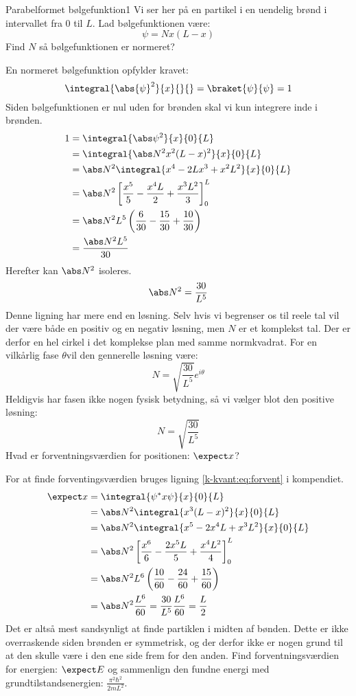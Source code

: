 \begin{opgave}{Parabelformet bølgefunktion}{1}\label{kvant:opg:parabel}
Vi ser her på en partikel i en uendelig brønd i intervallet fra $0$ til $L$. Lad bølgefunktionen være:
$$
\psi = Nx(L-x)
$$
\opg Find $N$ så bølgefunktionen er normeret?

En normeret bølgefunktion opfylder kravet:
$$
\integral{\abs{\psi}^2}{x}{}{}=\braket{\psi}{\psi}=1
$$
Siden bølgefunktionen er nul uden for brønden skal vi kun integrere inde i brønden.
\begin{align*}
    1 &= \integral{\abs \psi^2}{x}{0}{L}\\
    &= \integral{\abs N^2 x^2(L-x)^2}{x}{0}{L}\\
    &= \abs N^2\integral{x^4-2Lx^3+x^2L^2}{x}{0}{L}\\
    &= \abs N^2\left[\frac{x^5}{5}-\frac{x^4L}{2}+\frac{x^3L^2}{3}\right]_0^L\\
    &= \abs N^2L^5\left(\frac{6}{30}-\frac{15}{30}+\frac{10}{30}\right)\\
    &=\frac{\abs N^2L^5}{30}
\end{align*}
Herefter kan $\abs N^2$ isoleres.
$$
\abs N^2 = \frac{30}{L^5}
$$
Denne ligning har mere end en løsning. Selv hvis vi begrenser os til reele tal vil der være både en positiv og en negativ løsning, men $N$ er et komplekst tal. Der er derfor en hel cirkel i det komplekse plan med samme normkvadrat. For en vilkårlig fase $\theta$vil den gennerelle løsning være:
$$
N=\sqrt{\frac{30}{L^5}}e^{i\theta}
$$
Heldigvis har fasen ikke nogen fysisk betydning, så vi vælger blot den positive løsning:
$$
N=\sqrt{\frac{30}{L^5}}
$$
\opg Hvad er forventningsværdien for positionen: $\expect x$?

For at finde forventingsværdien bruges ligning \eqref{k-kvant:eq:forvent} i kompendiet.
\begin{align*}
    \expect x &= \integral{\psi^* x \psi}{x}{0}{L}\\
    &= \abs N^2 \integral{x^3(L-x)^2}{x}{0}{L}\\
    &= \abs N^2 \integral{x^5-2x^4L+x^3L^2}{x}{0}{L}\\
    &= \abs N^2 \left[\frac{x^6}{6}-\frac{2x^5L}{5}+\frac{x^4L^2}{4}\right]_0^L\\
    &= \abs N^2 L^6 \left(\frac{10}{60}-\frac{24}{60}+\frac{15}{60}\right)\\
    &= \abs N^2 \frac{L^6}{60}
    = \frac{30}{L^5}\frac{L^6}{60}
    = \frac{L}{2}
\end{align*}
Det er altså mest sandsynligt at finde partiklen i midten af bønden. Dette er ikke overraskende siden brønden er symmetrisk, og der derfor ikke er nogen grund til at den skulle være i den ene side frem for den anden.
\opg Find forventningsværdien for energien: $\expect E$ og sammenlign den fundne energi med grundtilstandsenergien: $\frac{\pi^2\hbar^2}{2mL^2}$.


\end{opgave}

